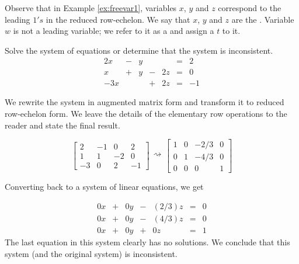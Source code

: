 \documentclass{ximera}
\begin{document}
Observe that in Example \ref{ex:freevar1}, variables $x$, $y$ and $z$ correspond to the leading $1's$ in the reduced row-echelon.  We say that $x$, $y$ and $z$ are the .  Variable $w$ is not a leading variable; we refer to it as a  and assign a  $t$ to it.

\begin{example}\label{ex:nosolutionssys}
Solve the system of equations or determine that the system is inconsistent.
$$\begin{array}{ccccccc}
      2x & -&y&&&= &2 \\
	 x& +&y&-&2z&=&0\\
     -3x& &&+&2z&=&-1
    \end{array}$$
    
    \begin{explanation}
    We rewrite the system in augmented matrix form and transform it to reduced row-echelon form.  We leave the details of the elementary row operations to the reader and state the final result.
    
   \begin{equation}\label{eq:sys20nosolutionsys} \left[\begin{array}{ccc|c}  
 2&-1&0&2\\1&1&-2&0\\-3&0&2&-1
 \end{array}\right]\begin{array}{c}
 \\
 \rightsquigarrow\\
 \\
 \end{array}\left[\begin{array}{ccc|c}  
 1&0&-2/3&0\\0&1&-4/3&0\\0&0&0&1
 \end{array}\right]\end{equation}
    
 Converting back to a system of linear equations, we get
 
 \begin{equation}\label{eq:sys20nosolutions}\begin{array}{ccccccc}
      0x &+ &0y&-&(2/3)z&= &0 \\
	 0x&+ &0y&-&(4/3)z&=&0\\
     0x&+ &0y&+&0z&=&1
    \end{array}\end{equation}
    The last equation in this system clearly has no solutions.  We conclude that this system (and the original system) is inconsistent.
    \end{explanation}
    
\end{example}
\end{document}

